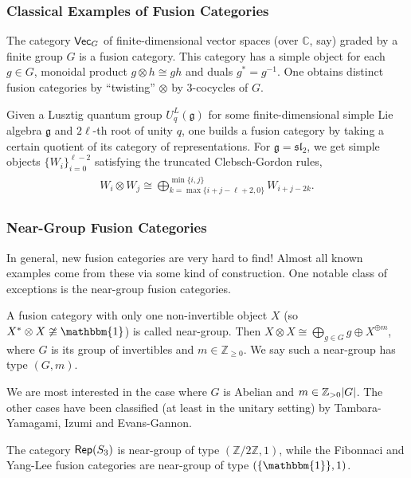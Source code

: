 \documentclass{beamer}
\theoremstyle{plain}
\theoremstyle{definition}
\DeclarePairedDelimiter{\abs}{\lvert}{\rvert}
\newcommand{\textcat}[1]{\textup{\textsf{#1}}}
\begin{document}
\begin{frame}
\frametitle{Classical Examples of Fusion Categories}
\begin{example}
The category \textcolor{structure}{$\textcat{Vec}_G$} of finite-dimensional vector spaces (over $\mathbb{C}$, say) graded by a finite group $G$ is a fusion category. This category has a simple object for each $g \in G$, monoidal product $g \otimes h \cong gh$ and duals $g^{*} = g^{-1}$. One obtains distinct fusion categories by ``twisting'' $\otimes$ by \textcolor{structure}{3-cocycles} of $G$.
\end{example}
\begin{example}
Given a Lusztig quantum group $U_q^L(\mathfrak{g})$ for some finite-dimensional simple Lie algebra $\mathfrak{g}$ and $2\ell$-th root of unity $q$, one builds a fusion category by taking a certain quotient of its category of representations. For $\mathfrak{g} = \mathfrak{sl}_2$, we get simple objects $\{W_i\}_{i=0}^{\ell-2}$ satisfying the \textcolor{structure}{truncated Clebsch-Gordon rules},
\begin{align*}
\begin{split}
W_i \otimes W_j \cong \bigoplus\nolimits_{k=\max\{i+j-\ell+2, 0\}}^{\min\{i, j\}}{W_{i+j-2k}}.
\end{split}
\end{align*}
\end{example}
\end{frame}

\begin{frame}
\frametitle{Near-Group Fusion Categories}
In general, new fusion categories are very hard to find! Almost all known examples come from these via some kind of construction. One notable class of exceptions is the \textcolor{structure}{near-group fusion categories}.
\begin{definition}
A fusion category with only one non-invertible object $X$ (so $X^{*} \otimes X \ncong \mathbbm{1}$) is called \textcolor{structure}{near-group}. Then $X \otimes X \cong \bigoplus_{g \in G}{g} \oplus X^{\oplus m}$, where $G$ is its group of invertibles and $m \in \mathbb{Z}_{\geq 0}$. We say such a near-group has \textcolor{structure}{type $(G, m)$}.
\end{definition}
We are most interested in the case where $G$ is Abelian and $m \in \mathbb{Z}_{>0}\abs{G}$. The other cases have been classified (at least in the unitary setting) by Tambara-Yamagami, Izumi and Evans-Gannon.
\begin{example}
The category $\textcat{Rep}(S_3)$ is near-group of type $(\mathbb{Z}/2\mathbb{Z}, 1)$, while the Fibonnaci and Yang-Lee fusion categories are near-group of type $(\{\mathbbm{1}\}, 1)$.
\end{example}
\end{frame}
\end{document}

